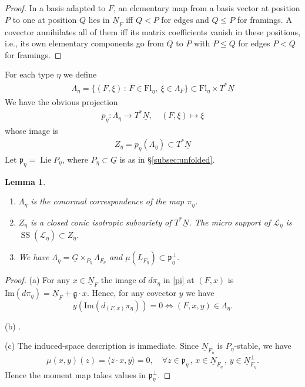 \documentclass[11pt,reqno]{amsart}
\newtheorem{Lemma}[Theorem]{Lemma}
\theoremstyle{definition}
\theoremstyle{remark}
\def\dN{\underline N}
\def\dG{\underline G}
\def\dg{\underline{\mathfrak g}}
\def\Fl{\mathrm{Fl}}
\def\frakp{\mathfrak p}
\begin{document}
\begin{proof}
In a basis adapted to $F$, an elementary map from a basis vector at position $P$ to one at position $Q$ lies in $\dN_F$ iff
$Q<P$ for edges and $Q\leqslant P$ for framings. A covector annihilates all of them iff its matrix coefficients vanish in these
positions, i.e., its own elementary components go from $Q$ to $P$ with $P\leqslant Q$ for edges  $P<Q$ for framings.
\end{proof}


For each type $\eta$ we define
\begin{align}\label{Lambda}
\Lambda_\eta=\{(F,\xi)\,:\,F\in\Fl_\eta,\ \xi\in\Lambda_F\}\subset\Fl_\eta\times T^*\dN
\end{align}
We have the obvious projection
\begin{align}\label{p}p_\eta:\Lambda_\eta\to T^*\dN,\quad(F,\xi)\mapsto\xi\end{align}
whose image is
\begin{align}\label{OE}Z_\eta=p_\eta(\Lambda_\eta)\subset T^*\dN\end{align}
Let $\frakp_\eta=\operatorname{Lie}P_\eta$, where $P_\eta\subset\dG$ is as in \S\ref{subsec:unfolded}.


\begin{Lemma}\label{lem:LZL}
\hfill
\begin{enumerate}[label=$\mathrm{(\alph*)}$,leftmargin=8mm]
\item
$\Lambda_\eta$ is the conormal correspondence of the map $\pi_\eta$.
\item
$Z_\eta$ is a closed conic isotropic subvariety of $T^*\dN$. 
The micro support of $\mathscr L_\eta$ is $\operatorname{SS}(\mathscr L_\eta)\subset Z_\eta$. 
\item
We have
$\Lambda_\eta=\dG\times_{P_\eta}\Lambda_{F_\eta}$ and
$\mu(L_{F_\eta})\subset\frakp_\eta^\perp$.
\end{enumerate}
\end{Lemma}

\begin{proof}\hfill

(a) 
For any $x\in\dN_F$ the image of $d\pi_\eta$ in \eqref{pi} at $(F,x)$ is
$\mathrm{Im}(d\pi_\eta)=\dN_F+\dg\cdot x$.
Hence, for any  covector $y$ we have
$$y(\mathrm{Im}(d_{(F,x)}\pi_\eta))=0\iff (F,x,y)\in\Lambda_\eta.$$

(b) \cite[Ch.~V, Ch.~VIII]{KS90}.

(c) The induced-space description is immediate. Since
$\dN_{F_\eta}$ is $P_\eta$-stable, we have
$$\mu(x,y)(z)=\langle z\cdot x,y\rangle=0
,\quad
\forall z\in\frakp_\eta\,,\, x\in\dN_{F_\eta}\,,\,y\in\dN_{F_\eta}^\perp.$$ 
Hence the moment map takes values in
$\frakp_\eta^\perp$.
\end{proof}
\end{document}
